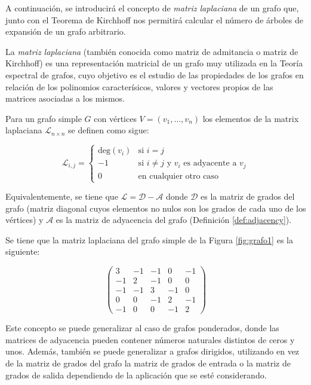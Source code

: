 A continuación, se introducirá el concepto de \emph{matriz laplaciana} de un grafo que, junto con el Teorema de Kirchhoff nos permitirá calcular el número de árboles de expansión de un grafo arbitrario.

\begin{definition}
La \emph{matriz laplaciana} (también conocida como matriz de admitancia o matriz de Kirchhoff) es una representación matricial de un grafo muy utilizada en la Teoría espectral de grafos, cuyo objetivo es el estudio de las propiedades de los grafos en relación de los polinomios caracterísicos, valores y vectores propios de las matrices asociadas a los mismos.

Para un grafo simple $G$ con vértices $V = (v_1,\dots,v_n)$ los elementos de la matrix laplaciana $\mathcal{L}_{n\times n}$ se definen como sigue:

\begin{equation}
\mathcal{L}_{i,j} = 
\begin{cases}
    \text{deg}(v_i) & \text{si } i=j \\
    -1 & \text{si } i\neq j \text{ y }v_i \text{ es adyacente a }v_j\\
    0 & \text{en cualquier otro caso}
\end{cases}
\end{equation}

Equivalentemente, se tiene que $\mathcal{L} = \mathcal{D} - \mathcal{A}$ donde $\mathcal{D}$ es la matriz de grados del grafo (matriz diagonal cuyos elementos no nulos son los grados de cada uno de los vértices) y $\mathcal{A}$ es la matriz de adyacencia del grafo (Definición \ref{def:adjacency}).
\end{definition}

\begin{exampleth}
Se tiene que la matriz laplaciana del grafo simple de la Figura \ref{fig:grafo1} es la siguiente:

\begin{equation}
\begin{pmatrix}
3 & -1 & -1 & 0 & -1\\
-1 & 2 & -1 & 0 & 0\\
-1 & -1 & 3 & -1 & 0\\
0 & 0 & -1 & 2 & -1\\
-1 & 0 & 0 & -1 & 2
\end{pmatrix}
\end{equation}
\end{exampleth}

Este concepto se puede generalizar al caso de grafos ponderados, donde las matrices de adyacencia pueden contener números naturales distintos de ceros y unos. Además, también se puede generalizar a grafos dirigidos, utilizando en vez de la matriz de grados del grafo la matriz de grados de entrada o la matriz de grados de salida dependiendo de la aplicación que se esté considerando.

